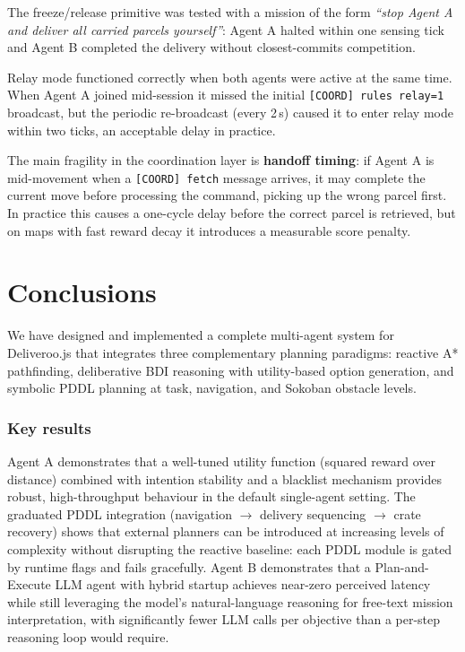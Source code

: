 \documentclass[10pt,a4paper,twocolumn]{article}
\begin{document}
The freeze/release primitive was tested with a mission of the form
\emph{``stop Agent A and deliver all carried parcels yourself''}: Agent A
halted within one sensing tick and Agent B completed the delivery without
closest-commits competition.

Relay mode functioned correctly when both agents were active at the same
time.  When Agent A joined mid-session it missed the initial
\texttt{[COORD] rules relay=1} broadcast, but the periodic re-broadcast
(every 2\,s) caused it to enter relay mode within two ticks, an
acceptable delay in practice.

The main fragility in the coordination layer is \textbf{handoff timing}:
if Agent A is mid-movement when a \texttt{[COORD] fetch} message arrives,
it may complete the current move before processing the command, picking up
the wrong parcel first.  In practice this causes a one-cycle delay before
the correct parcel is retrieved, but on maps with fast reward decay it
introduces a measurable score penalty.

\section{Conclusions}
\label{sec:conclusions}

We have designed and implemented a complete multi-agent system for Deliveroo.js
that integrates three complementary planning paradigms: reactive A* pathfinding,
deliberative BDI reasoning with utility-based option generation, and symbolic
PDDL planning at task, navigation, and Sokoban obstacle levels.

\subsubsection*{Key results}
Agent A demonstrates that a well-tuned utility function (squared reward over
distance) combined with intention stability and a blacklist mechanism provides
robust, high-throughput behaviour in the default single-agent setting.  The
graduated PDDL integration (navigation $\to$ delivery sequencing $\to$ crate
recovery) shows that external planners can be introduced at increasing levels of
complexity without disrupting the reactive baseline: each PDDL module is gated
by runtime flags and fails gracefully.  Agent B demonstrates that a
Plan-and-Execute LLM agent with hybrid startup achieves near-zero perceived
latency while still leveraging the model's natural-language reasoning for free-text
mission interpretation, with significantly fewer LLM calls per objective than
a per-step reasoning loop would require.
\end{document}
